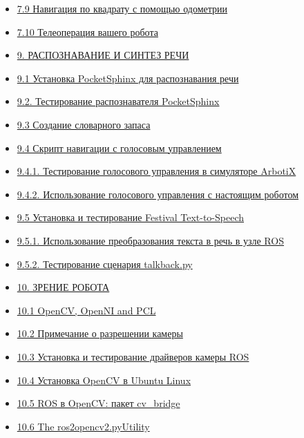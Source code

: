 \begin{itemize}
\item { \href{untitled-5.md}{7.9 Навигация по квадрату с помощью одометрии}} 
\item { \href{untitled-6.md}{7.10 Телеоперация вашего робота}} 
\item { \href{9.-raspoznavanie-i-sintez-rechi.md}{9. РАСПОЗНАВАНИЕ И СИНТЕЗ РЕЧИ}} 
\item { \href{9.1-ustanovka-pocketsphinx-dlya-raspoznavaniya-rechi.md}{9.1 Установка PocketSphinx для распознавания речи}} 
\item { \href{9.2.-testirovanie-raspoznavatelya-pocketsphinx.md}{9.2. Тестирование распознавателя PocketSphinx}} 
\item { \href{9.3-sozdanie-slovarnogo-zapasa.md}{9.3 Создание словарного запаса}} 
\item { \href{9.4-skript-navigacii-s-golosovym-upravleniem.md}{9.4 Скрипт навигации с голосовым управлением}} 
\item { \href{9.4.1.-testirovanie-golosovogo-upravleniya-v-simulyatore-arbotix.md}{9.4.1. Тестирование голосового управления в симуляторе ArbotiX}} 
\item { \href{9.4.2.-ispolzovanie-golosovogo-upravleniya-s-nastoyashim-robotom.md}{9.4.2. Использование голосового управления с настоящим роботом}} 
\item { \href{9.5-ustanovka-i-testirovanie-festival-text-to-speech.md}{9.5 Установка и тестирование Festival Text-to-Speech}} 
\item { \href{9.5.1.-ispolzovanie-preobrazovaniya-teksta-v-rech-v-uzle-ros.md}{9.5.1. Использование преобразования текста в речь в узле ROS}} 
\item { \href{9.5.2.-testirovanie-scenariya-talkback.py.md}{9.5.2. Тестирование сценария talkback.py}} 
\item { \href{10.-zrenie-robota.md}{10. ЗРЕНИЕ РОБОТА}} 
\item { \href{10.1-opencv-openni-and-pcl.md}{10.1 OpenCV, OpenNI and PCL}} 
\item { \href{10.2-primechanie-o-razreshenii-kamery.md}{10.2 Примечание о разрешении камеры}} 
\item { \href{10.3-ustanovka-i-testirovanie-draiverov-kamery-ros.md}{10.3 Установка и тестирование драйверов камеры ROS}} 
\item { \href{10.4-ustanovka-opencv-v-ubuntu-linux.md}{10.4 Установка OpenCV в Ubuntu Linux}} 
\item { \href{10.5-ros-v-opencv-paket-cv_bridge.md}{10.5 ROS в OpenCV: пакет cv\_bridge}} 
\item { \href{10.6-the-ros2opencv2.pyutility.md}{10.6 The ros2opencv2.pyUtility}} 

\end{itemize}
